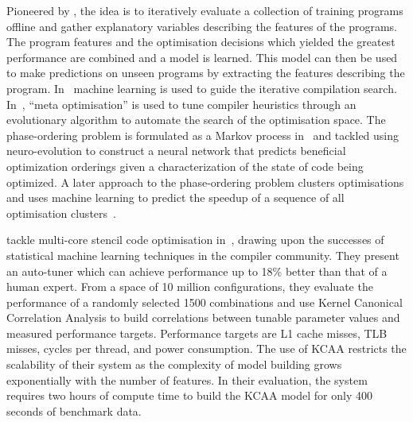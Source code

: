 Pioneered by \citeauthor{Agakov}, the idea is to iteratively evaluate a collection of training programs offline and gather explanatory variables describing the features of the programs. The program features and the optimisation decisions which yielded the greatest performance are combined and a model is learned. This model can then be used to make predictions on unseen programs by extracting the features describing the program. In~\cite{Agakov} machine learning is used to guide the iterative compilation search.
In~\cite{Stephenson2003}, ``meta optimisation'' is used to tune compiler heuristics through an evolutionary algorithm to automate the search of the optimisation space.
The phase-ordering problem is formulated as a Markov process in~\cite{Kulkarni2012} and tackled using neuro-evolution to construct a neural network that predicts beneficial optimization orderings given a characterization of the state of code being optimized.
A later approach to the phase-ordering problem clusters optimisations and uses machine learning to predict the speedup of a sequence of all optimisation clusters~\cite{Ashouri2017}.

\citeauthor{Ganapathi2009} tackle multi-core stencil code optimisation in~\cite{Ganapathi2009}, drawing upon the successes of statistical machine learning techniques in the compiler community. They present an auto-tuner which can achieve performance up to 18\% better than that of a human expert. From a space of 10 million configurations, they evaluate the performance of a randomly selected 1500 combinations and use Kernel Canonical Correlation Analysis to build correlations between tunable parameter values and measured performance targets. Performance targets are L1 cache misses, TLB misses, cycles per thread, and power consumption. The use of KCAA restricts the scalability of their system as the complexity of model building grows exponentially with the number of features. In their evaluation, the system requires two hours of compute time to build the KCAA model for only 400 seconds of benchmark data.

